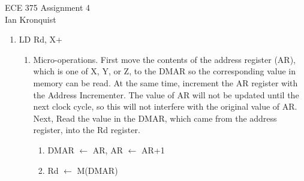 \documentclass[12pt,letterpaper]{article}
\begin{document}
\begin{flushright}
{\large
ECE 375 Assignment 4\\
Ian Kronquist
}
\end{flushright}

\bigskip

\begin{enumerate}
    \item LD Rd, X+
    \begin{enumerate}
        \item Micro-operations. First move the contents of the address register (AR), which is one of X, Y, or Z, to the DMAR so the corresponding value in memory can be read. At the same time, increment the AR register with the Address Incrementer. The value of AR will not be updated until the next clock cycle, so this will not interfere with the original value of AR. Next, Read the value in the DMAR, which came from the address register, into the Rd register. \\
        \begin{enumerate}[i]
            \item DMAR $\leftarrow$ AR, AR $\leftarrow$ AR+1
            \item Rd $\leftarrow$ M(DMAR)
        \end{enumerate}


\end{enumerate}
\end{enumerate}
\end{document}
